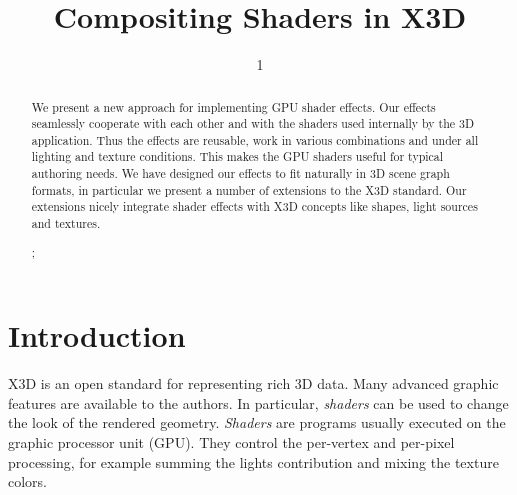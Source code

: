 \documentclass{egpubl}
\title{Compositing Shaders in X3D}
\author{1} %
\begin{document}

\maketitle

\begin{abstract}
We present a new approach for implementing GPU shader effects.
Our effects seamlessly cooperate with each other and with
the shaders used internally by the 3D application.
Thus the effects are reusable, work in various combinations
and under all lighting and texture conditions.
This makes the GPU shaders useful for typical authoring needs.
We have designed our effects to fit naturally in 3D scene graph formats,
in particular we present a number of extensions to the X3D standard.
Our extensions nicely integrate shader effects with X3D
concepts like shapes, light sources and textures.


\begin{classification}
  ;
\end{classification}

\end{abstract}


\section{Introduction}


X3D \cite{x3d:spec} is an open standard for representing rich 3D data.
Many advanced graphic features are available to the authors.
In particular, \emph{shaders} can be used to change the look of the rendered
geometry.
\emph{Shaders} are programs usually executed on the graphic processor unit
(GPU). They control the per-vertex and per-pixel processing,
for example summing the lights contribution
and mixing the texture colors.
\end{document}
